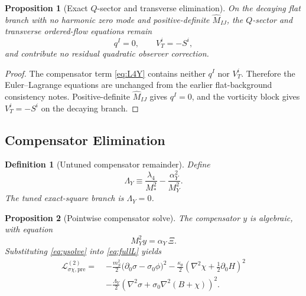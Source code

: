 \documentclass[11pt]{article}
\newtheorem{definition}{Definition}
\newtheorem{proposition}{Proposition}
\begin{document}
\begin{proposition}[Exact \(Q\)-sector and transverse elimination]
\label{prop:qv}
On the decaying flat branch with no harmonic zero mode and positive-definite \(\widehat M_{IJ}\), the \(Q\)-sector and transverse ordered-flow equations remain
\begin{equation}
q^I=0,
\qquad
V_T^i=-S^i,
\label{eq:qvsolve}
\end{equation}
and contribute no residual quadratic observer correction.
\end{proposition}

\begin{proof}
The compensator term \eqref{eq:L4Y} contains neither \(q^I\) nor \(V_T^i\). Therefore the Euler--Lagrange equations are unchanged from the earlier flat-background consistency notes. Positive-definite \(\widehat M_{IJ}\) gives \(q^I=0\), and the vorticity block gives \(V_T^i=-S^i\) on the decaying branch.
\end{proof}

\subsection{Compensator Elimination}

\begin{definition}[Untuned compensator remainder]
\label{def:LambdaY}
Define
\begin{equation}
\Lambda_Y
\equiv
\frac{\lambda_4}{M_*^2}-\frac{\alpha_Y^2}{M_Y^2}.
\label{eq:LambdaY}
\end{equation}
The tuned exact-square branch is \(\Lambda_Y=0\).
\end{definition}

\begin{proposition}[Pointwise compensator solve]
\label{prop:ysolve}
The compensator \(y\) is algebraic, with equation
\begin{equation}
M_Y^2y=\alpha_Y\,\Xi.
\label{eq:ysolve}
\end{equation}
Substituting \eqref{eq:ysolve} into \eqref{eq:fullL} yields
\begin{align}
\mathcal L_{\sigma\chi,\mathrm{pre}}^{(2)}
=\;&
-\frac{m_S^2}{2}\bigl(\partial_0\sigma-\sigma_0\phi\bigr)^2
-\frac{\kappa_\theta}{2}
\left(\nabla^2\chi+\frac{1}{2}\partial_0H\right)^2
\nonumber\\
&-\frac{\Lambda_Y}{2}
\left(
\nabla^2\sigma+\sigma_0\nabla^2(B+\chi)
\right)^2.
\label{eq:Lprech}
\end{align}
\end{proposition}
\end{document}
